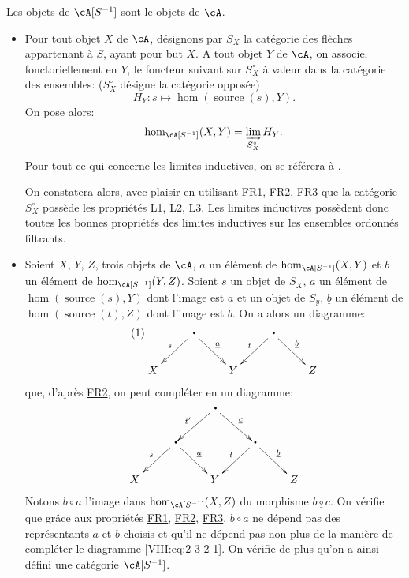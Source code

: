 Les objets de $\cA[S^{-1}]$ sont le objets de $\cA$. 
\begin{itemize}
  \item Pour tout objet $X$ de $\cA$, d\'esignons par $S_X$ la cat\'egorie des 
    fl\`eches appartenant \`a $S$, ayant pour but $X$. A tout objet $Y$ de 
    $\cA$, on associe, fonctoriellement en $Y$, le foncteur suivant sur 
    $S_X^\circ$ \`a valeur dans la cat\'egorie des ensembles: 
    ($S_X^\circ$ d\'esigne la cat\'egorie oppos\'ee) 
    \[
      H_Y:s\mapsto \hom(\operatorname{source}(s),Y) \text{.}
    \]
    On pose alors: 
    \[
      \hom_{\cA[S^{-1}]}(X,Y) = \varinjlim_{S_X^\circ} H_Y \text{.}
    \]
    Pour tout ce qui concerne les limites inductives, on se r\'ef\'erera \`a 
    \cite{ar62}. 
    
    On constatera alors, avec plaisir en utilisant \hyperlink{VIII:FR1}{FR1}, 
    \hyperlink{VIII:FR2}{FR2}, \hyperlink{VIII:FR3}{FR3} que la cat\'egorie 
    $S_X^\circ$ poss\`ede les propri\'et\'es L1, L2, L3. Les limites inductives 
    poss\`edent donc toutes les bonnes propri\'et\'es des limites inductives 
    sur les ensembles ordonn\'es filtrants. 
  \item Soient $X$, $Y$, $Z$, trois objets de $\cA$, $a$ un \'el\'ement de 
    $\hom_{\cA[S^{-1}]}(X,Y)$ et $b$ un \'el\'ement de 
    $\hom_{\cA[S^{-1}]}(Y,Z)$. Soient $s$ un objet de $S_X$, $\underline a$ un 
    \'el\'ement de $\hom(\operatorname{source}(s),Y)$ dont l'image est $a$ et 
    un objet de $S_y$, $\underline b$ un \'el\'ement de 
    $\hom(\operatorname{source}(t),Z)$ dont l'image est $b$. On a alors un 
    diagramme: 
    \begin{equation*}\tag{1}\label{VIII:eq:2-3-2-1}
    \xymatrix{
      & \bullet \ar[dl]_-s \ar[dr]^-{\underline a} 
        & 
        & \bullet \ar[dl]_-t \ar[dr]^-{\underline b} \\
      X 
        & 
        & Y 
        & 
        & Z 
    }
    \end{equation*}
    que, d'apr\`es \hyperlink{VIII:FR2}{FR2}, on peut compl\'eter en un 
    diagramme: 
    \[\xymatrix{
      & & \bullet \ar[dl]_-{t'} \ar[dr]^-{\underline c} \\
      & \bullet \ar[dl]_-s \ar[dr]^-{\underline a} 
        & & \bullet \ar[dl]_-t \ar[dr]^-{\underline b} \\
      X 
        & & Y 
        & & Z 
    }\]
    Notons $b\circ a$ l'image dans $\hom_{\cA[S^{-1}]}(X,Z)$ du morphisme 
    $\underline{b\circ c}$. On v\'erifie que gr\^ace aux propri\'et\'es 
    \hyperlink{VIII:FR1}{FR1}, \hyperlink{VIII:FR2}{FR2}, 
    \hyperlink{VIII:FR3}{FR3}, $b\circ a$ ne d\'epend pas des repr\'esentants 
    $\underline a$ et $\underline b$ choisis et qu'il ne d\'epend pas non plus 
    de la mani\`ere de compl\'eter le diagramme \eqref{VIII:eq:2-3-2-1}. On 
    v\'erifie de plus qu'on a ainsi d\'efini une cat\'egorie $\cA[S^{-1}]$. 
\end{itemize}

